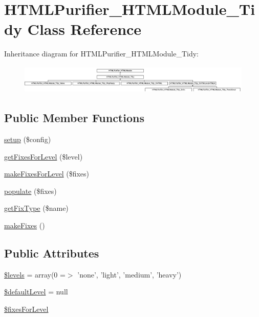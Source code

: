 \hypertarget{classHTMLPurifier__HTMLModule__Tidy}{\section{H\+T\+M\+L\+Purifier\+\_\+\+H\+T\+M\+L\+Module\+\_\+\+Tidy Class Reference}
\label{classHTMLPurifier__HTMLModule__Tidy}
}
Inheritance diagram for H\+T\+M\+L\+Purifier\+\_\+\+H\+T\+M\+L\+Module\+\_\+\+Tidy\+:\begin{figure}[H]
\begin{center}
\leavevmode
\includegraphics[height=1.382716cm]{classHTMLPurifier__HTMLModule__Tidy}
\end{center}
\end{figure}
\subsection*{Public Member Functions}
\begin{DoxyCompactItemize}
\item 
\hyperlink{classHTMLPurifier__HTMLModule__Tidy_a6323f0f69fdfff474a74d06e8f3cd243}{setup} (\$config)
\item 
\hyperlink{classHTMLPurifier__HTMLModule__Tidy_a6afdc4634fb922bf30d1ff3c12bd85e9}{get\+Fixes\+For\+Level} (\$level)
\item 
\hyperlink{classHTMLPurifier__HTMLModule__Tidy_ac43c0c36259def83c6ef683b78b80fd6}{make\+Fixes\+For\+Level} (\$fixes)
\item 
\hyperlink{classHTMLPurifier__HTMLModule__Tidy_a6de72c535591cf82e476bc7e1b318b93}{populate} (\$fixes)
\item 
\hyperlink{classHTMLPurifier__HTMLModule__Tidy_a369780c323dab34c67daff15f0f97518}{get\+Fix\+Type} (\$name)
\item 
\hyperlink{classHTMLPurifier__HTMLModule__Tidy_ad8953241f58e692c30a3453f5a25c0bf}{make\+Fixes} ()
\end{DoxyCompactItemize}
\subsection*{Public Attributes}
\begin{DoxyCompactItemize}
\item 
\hyperlink{classHTMLPurifier__HTMLModule__Tidy_a700db969800293dd50c3b85c29722b80}{\$levels} = array(0 =$>$ 'none', 'light', 'medium', 'heavy')
\item 
\hyperlink{classHTMLPurifier__HTMLModule__Tidy_a6a5534b32d85f3e0c16a8325cf7f7f4a}{\$default\+Level} = null
\item 
\hyperlink{classHTMLPurifier__HTMLModule__Tidy_a1bfe0abd281d86ed31562468d0104aac}{\$fixes\+For\+Level}
\end{DoxyCompactItemize}


